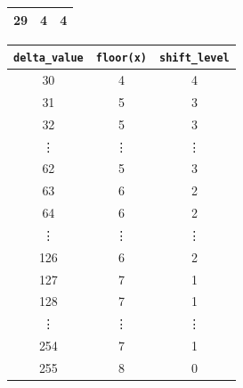 \documentclass{article}
\begin{document}
\begin{itemize}
\begin{table}[h]
\begin{tabular}{||c|c|c||}
                    29                    & 4                              & 4                     \\\hline
                \end{tabular}\hspace{20pt}
                \begin{tabular}{||c|c|c||}
                    \hline
                    \texttt{delta\_value} & \texttt{floor(x)\footnotemark[\value{footnote}]} & \texttt{shift\_level} \\
                    \hline \hline
                    30                    & 4                                                & 4                     \\\hline
                    31                    & 5                                                & 3                     \\\hline
                    32                    & 5                                                & 3                     \\\hline
                    \vdots                & \vdots                                           & \vdots                \\\hline
                    62                    & 5                                                & 3                     \\\hline
                    63                    & 6                                                & 2                     \\\hline
                    64                    & 6                                                & 2                     \\\hline
                    \vdots                & \vdots                                           & \vdots                \\\hline
                    126                   & 6                                                & 2                     \\\hline
                    127                   & 7                                                & 1                     \\\hline
                    128                   & 7                                                & 1                     \\\hline
                    \vdots                & \vdots                                           & \vdots                \\\hline
                    254                   & 7                                                & 1                     \\\hline
                    255                   & 8                                                & 0                     \\\hline
                \end{tabular}
            \end{table}
            \vspace{0,2cm}


\end{itemize}
\end{document}
